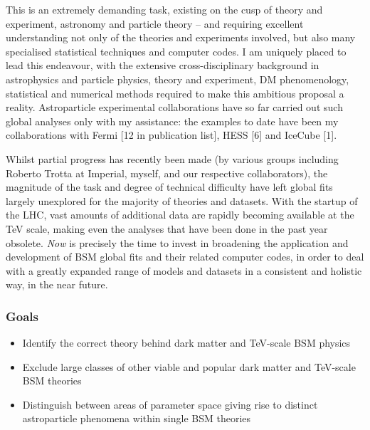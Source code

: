 \documentclass[10pt,oneside,twocolumn,a4paper]{article}
\begin{document}
This is an extremely demanding task, existing on the cusp of theory and experiment, astronomy and particle theory -- and requiring excellent understanding not only of the theories and experiments involved, but also many specialised statistical techniques and computer codes.  I am uniquely placed to lead this endeavour, with the extensive cross-disciplinary background in astrophysics and particle physics, theory and experiment, DM phenomenology, statistical and numerical methods required to make this ambitious proposal a reality.  Astroparticle experimental collaborations have so far carried out such global analyses only with my assistance: the examples to date have been my collaborations with Fermi [12 in publication list], HESS [6] and IceCube [1].

Whilst partial progress has recently been made (by various groups including Roberto Trotta at Imperial, myself, and our respective collaborators), the magnitude of the task and degree of technical difficulty have left global fits largely unexplored for the majority of theories and datasets.  With the startup of the LHC, vast amounts of additional data are rapidly becoming available at the TeV scale, making even the analyses that have been done in the past year obsolete.  \textit{Now} is precisely the time to invest in broadening the application and development of BSM global fits and their related computer codes, in order to deal with a greatly expanded range of models and datasets in a consistent and holistic way, in the near future.

\subsubsection*{Goals}

\begin{itemize}
\item Identify the correct theory behind dark matter and TeV-scale BSM physics
\item Exclude large classes of other viable and popular dark matter and TeV-scale BSM theories
\item Distinguish between areas of parameter space giving rise to distinct astroparticle phenomena within single BSM theories
\end{itemize}
\end{document}
